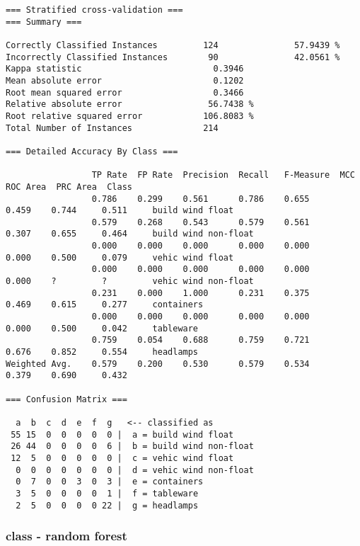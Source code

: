 \documentclass[a4paper]{article}
\begin{document}
\begin{verbatim}
=== Stratified cross-validation ===
=== Summary ===

Correctly Classified Instances         124               57.9439 %
Incorrectly Classified Instances        90               42.0561 %
Kappa statistic                          0.3946
Mean absolute error                      0.1202
Root mean squared error                  0.3466
Relative absolute error                 56.7438 %
Root relative squared error            106.8083 %
Total Number of Instances              214

=== Detailed Accuracy By Class ===

                 TP Rate  FP Rate  Precision  Recall   F-Measure  MCC      ROC Area  PRC Area  Class
                 0.786    0.299    0.561      0.786    0.655      0.459    0.744     0.511     build wind float
                 0.579    0.268    0.543      0.579    0.561      0.307    0.655     0.464     build wind non-float
                 0.000    0.000    0.000      0.000    0.000      0.000    0.500     0.079     vehic wind float
                 0.000    0.000    0.000      0.000    0.000      0.000    ?         ?         vehic wind non-float
                 0.231    0.000    1.000      0.231    0.375      0.469    0.615     0.277     containers
                 0.000    0.000    0.000      0.000    0.000      0.000    0.500     0.042     tableware
                 0.759    0.054    0.688      0.759    0.721      0.676    0.852     0.554     headlamps
Weighted Avg.    0.579    0.200    0.530      0.579    0.534      0.379    0.690     0.432

=== Confusion Matrix ===

  a  b  c  d  e  f  g   <-- classified as
 55 15  0  0  0  0  0 |  a = build wind float
 26 44  0  0  0  0  6 |  b = build wind non-float
 12  5  0  0  0  0  0 |  c = vehic wind float
  0  0  0  0  0  0  0 |  d = vehic wind non-float
  0  7  0  0  3  0  3 |  e = containers
  3  5  0  0  0  0  1 |  f = tableware
  2  5  0  0  0  0 22 |  g = headlamps
\end{verbatim}


\subsubsection{class - random forest}
\end{document}
